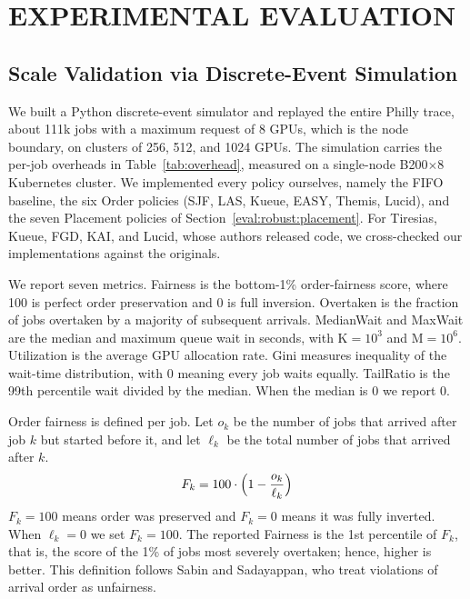 \documentclass{ieeetj}
\begin{document}
\section{EXPERIMENTAL EVALUATION}\label{sec:eval}

\subsection{Scale Validation via Discrete-Event Simulation}\label{eval:sim}
We built a Python discrete-event simulator and replayed the entire Philly trace\cite{jeon2019philly}, about 111k jobs with a maximum request of 8 GPUs, which is the node boundary, on clusters of 256, 512, and 1024 GPUs. The simulation carries the per-job overheads in Table~\ref{tab:overhead}, measured on a single-node B200$\times$8 Kubernetes cluster. We implemented every policy ourselves, namely the FIFO baseline, the six Order policies (SJF, LAS, Kueue, EASY, Themis, Lucid), and the seven Placement policies of Section~\ref{eval:robust:placement}. For Tiresias, Kueue, FGD, KAI, and Lucid, whose authors released code, we cross-checked our implementations against the originals.

\begin{table}[htb!]
\centering
\caption{Per-job lifecycle overhead}
\label{tab:overhead}
\small
{}
\end{table}

\noindent We report seven metrics. Fairness is the bottom-1\% order-fairness score, where 100 is perfect order preservation and 0 is full inversion. Overtaken is the fraction of jobs overtaken by a majority of subsequent arrivals. MedianWait and MaxWait are the median and maximum queue wait in seconds, with K$=10^3$ and M$=10^6$. Utilization is the average GPU allocation rate. Gini measures inequality of the wait-time distribution, with 0 meaning every job waits equally. TailRatio is the 99th percentile wait divided by the median. When the median is 0 we report 0.

Order fairness is defined per job. Let $o_k$ be the number of jobs that arrived after job $k$ but started before it, and let $\ell_k$ be the total number of jobs that arrived after $k$.
\begin{equation}
F_k = 100\cdot\Bigl(1 - \frac{o_k}{\ell_k}\Bigr)
\label{eq:order-fair}
\end{equation}
$F_k=100$ means order was preserved and $F_k=0$ means it was fully inverted. When $\ell_k=0$ we set $F_k=100$. The reported Fairness is the 1st percentile of $F_k$, that is, the score of the 1\% of jobs most severely overtaken; hence, higher is better. This definition follows Sabin and Sadayappan\cite{sabin2005unfairness}, who treat violations of arrival order as unfairness.
\end{document}
